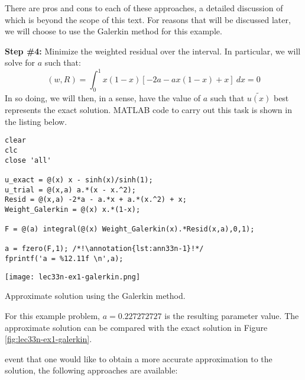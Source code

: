 There are pros and cons to each of these approaches, a detailed discussion of which is beyond the scope of this text.  For reasons that will be discussed later, we will choose to use the Galerkin method for this example.

\vspace{0.25cm}

\noindent\textbf{Step \#4:} Minimize the weighted residual over the interval.  In particular, we will solve for $a$ such that:
\begin{equation*}
\left(w,R\right)=\int_{0}^{1} x(1-x)\left[-2a - ax(1-x) + x\right] \ dx = 0
\end{equation*}
In so doing, we will then, in a sense, have the value of $a$ such that $\tilde{u(x)}$ best represents the exact solution.  MATLAB code to carry out this task is shown in the listing below.
\begin{lstlisting}[style=myMatlab,name=lec33n-ex1]
clear
clc
close 'all'

u_exact = @(x) x - sinh(x)/sinh(1);
u_trial = @(x,a) a.*(x - x.^2);
Resid = @(x,a) -2*a - a.*x + a.*(x.^2) + x;
Weight_Galerkin = @(x) x.*(1-x);

F = @(a) integral(@(x) Weight_Galerkin(x).*Resid(x,a),0,1);

a = fzero(F,1); /*!\annotation{lst:ann33n-1}!*/
fprintf('a = %12.11f \n',a);
\end{lstlisting}
\begin{marginfigure}
\texttt{[image: lec33n-ex1-galerkin.png]}
\caption{Approximate solution using the Galerkin method.}
\label{fig:lec33n-ex1-galerkin}
\end{marginfigure}
For this example problem, $a = 0.227272727$ is the resulting parameter value.  The approximate solution can be compared with the exact solution in Figure \ref{fig:lec33n-ex1-galerkin}.  

 event that one would like to obtain a more accurate approximation to the solution, the following approaches are available:

